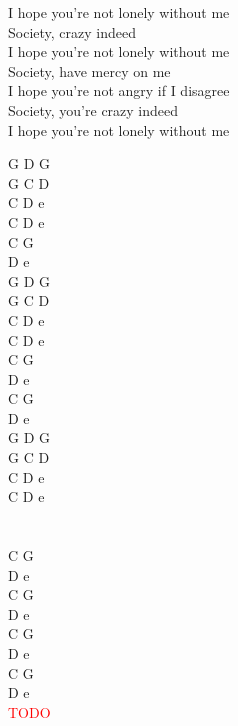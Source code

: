 \documentclass[a5paper, 10pt]{book}
\begin{document}
\begin{minipage}[t]{0.9\textwidth}
\hspace*{5mm}I hope you’re not lonely without me\\
\hspace*{5mm}Society, crazy indeed\\
\hspace*{5mm}I hope you’re not lonely without me\\
\hspace*{5mm}Society, have mercy on me\\
\hspace*{5mm}I hope you’re not angry if I disagree\\
\hspace*{5mm}Society, you’re crazy indeed\\
\hspace*{5mm}I hope you’re not lonely without me\\
\end{minipage}
\begin{minipage}[t]{0.1\textwidth}
G D G\\
G C D\\
C D e\\
C D e\\

C G\\
D e\\

G D G\\
G C D\\
C D e\\
C D e\\

C G\\
D e\\
C G\\
D e\\

G D G\\
G C D\\
C D e\\
C D e\\
\\
\\
C G\\
D e\\
C G\\
D e\\
C G\\
D e\\
C G\\
D e\\

\textcolor{red}{TODO}\\
\end{minipage}
\end{document}
